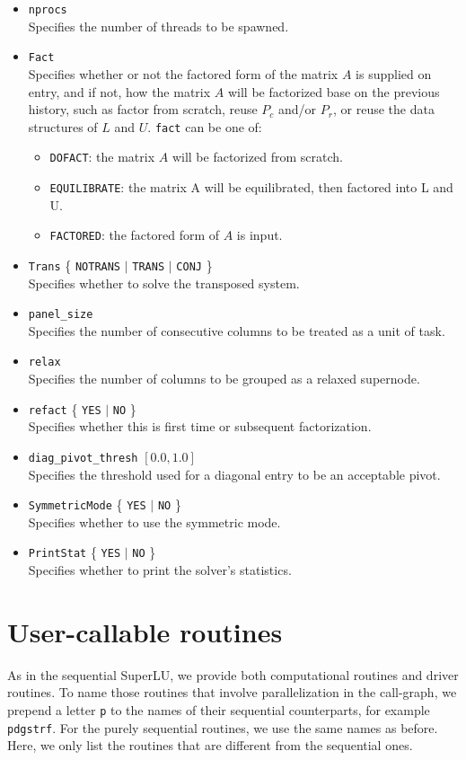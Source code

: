 \begin{itemize}
\item {\tt nprocs} \\
    Specifies the number of threads to be spawned.
\item {\tt Fact}\\
    Specifies whether or not the factored form of the matrix
    $A$ is supplied on entry, and if not, how the matrix $A$ will
    be factorized base on the previous history, such as factor from
    scratch, reuse $P_c$ and/or $P_r$, or reuse the data structures of $L$
    and $U$. 
    {\tt fact} can be one of:
    \begin{itemize}
    \item {\tt DOFACT}: the matrix $A$ will be factorized from scratch.
    \item {\tt EQUILIBRATE}: the matrix A will be equilibrated, then
             factored into L and U.
    \item {\tt FACTORED}: the factored form of $A$ is input.
    \end{itemize}
\item {\tt Trans}  \{ {\tt NOTRANS} $|$ {\tt TRANS} $|$ {\tt CONJ} \} \\
    Specifies whether to solve the transposed system.
\item {\tt panel\_size} \\
    Specifies the number of consecutive columns to be treated as a
    unit of task.
\item {\tt relax} \\
    Specifies the number of columns to be grouped as a relaxed
    supernode.
\item {\tt refact}  \{ {\tt YES} $|$ {\tt NO} \} \\
    Specifies whether this is first time or subsequent factorization.
\item {\tt diag\_pivot\_thresh}  $[0.0, 1.0]$ \\
    Specifies the threshold used for a diagonal entry to be an
    acceptable pivot.
\item {\tt SymmetricMode}  \{ {\tt YES} $|$ {\tt NO} \} \\
    Specifies whether to use the symmetric mode.
\item {\tt PrintStat}  \{ {\tt YES} $|$ {\tt NO} \} \\
    Specifies whether to print the solver's statistics.
\end{itemize}


\section{User-callable routines}
As in the sequential SuperLU, we provide both computational routines and
driver routines. To name those routines that involve parallelization in the
call-graph, we prepend a letter {\tt p} to the names of their sequential
counterparts, for example {\tt pdgstrf}.
For the purely sequential routines, we use the same names as before.
Here, we only list the routines that are different from the sequential ones.

